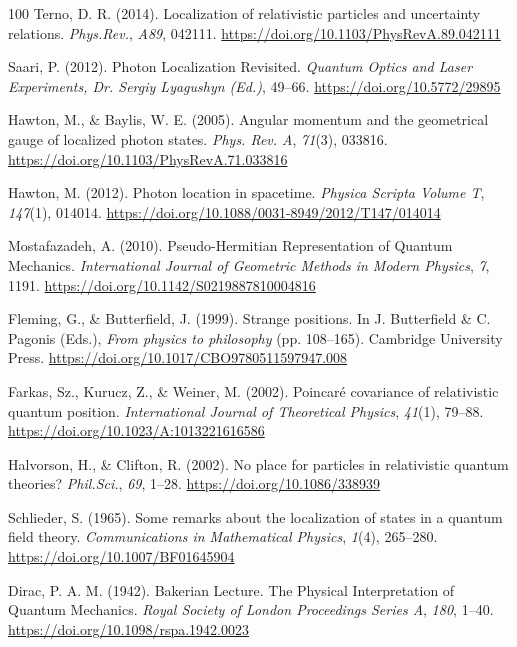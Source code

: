 \documentclass[11pt]{book}
\begin{document}
\begin{thebibliography}{100}
 Terno, D. R. (2014). Localization of relativistic particles and
uncertainty relations. \emph{Phys.Rev.}, \emph{A89}, 042111.
\url{https://doi.org/10.1103/PhysRevA.89.042111}

 Saari, P. (2012). Photon Localization Revisited. \emph{Quantum Optics
and Laser Experiments, Dr. Sergiy Lyagushyn (Ed.)}, 49--66.
\url{https://doi.org/10.5772/29895}

 Hawton, M., \& Baylis, W. E. (2005). Angular momentum and the
geometrical gauge of localized photon states. \emph{Phys. Rev. A},
\emph{71}(3), 033816. \url{https://doi.org/10.1103/PhysRevA.71.033816}

 Hawton, M. (2012). Photon location in spacetime. \emph{Physica Scripta
Volume T}, \emph{147}(1), 014014.
\url{https://doi.org/10.1088/0031-8949/2012/T147/014014}

 Mostafazadeh, A. (2010). Pseudo-Hermitian Representation of Quantum
Mechanics. \emph{International Journal of Geometric Methods in Modern
Physics}, \emph{7}, 1191.
\url{https://doi.org/10.1142/S0219887810004816}

 Fleming, G., \& Butterfield, J. (1999). Strange positions. In J.
Butterfield \& C. Pagonis (Eds.), \emph{From physics to philosophy} (pp.
108--165). Cambridge University Press.
\url{https://doi.org/10.1017/CBO9780511597947.008}

 Farkas, Sz., Kurucz, Z., \& Weiner, M. (2002). Poincaré covariance of
relativistic quantum position. \emph{International Journal of
Theoretical Physics}, \emph{41}(1), 79--88.
\url{https://doi.org/10.1023/A:1013221616586}

 Halvorson, H., \& Clifton, R. (2002). No place for particles in
relativistic quantum theories? \emph{Phil.Sci.}, \emph{69}, 1--28.
\url{https://doi.org/10.1086/338939}

 Schlieder, S. (1965). Some remarks about the localization of states in a
quantum field theory. \emph{Communications in Mathematical Physics},
\emph{1}(4), 265--280. \url{https://doi.org/10.1007/BF01645904}

 Dirac, P. A. M. (1942). Bakerian Lecture. The Physical Interpretation of
Quantum Mechanics. \emph{Royal Society of London Proceedings Series A},
\emph{180}, 1--40. \url{https://doi.org/10.1098/rspa.1942.0023}


\end{thebibliography}
\end{document}
